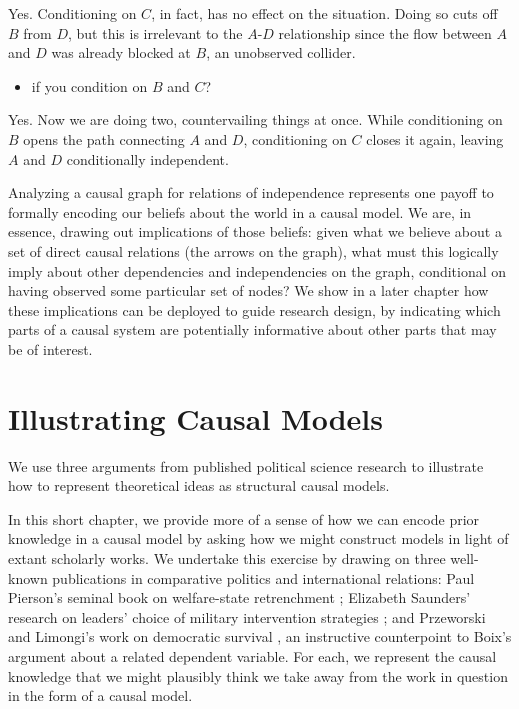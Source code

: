 \documentclass[
  12pt,
]{book}
\providecommand{\tightlist}{%
  \setlength{\itemsep}{0pt}\setlength{\parskip}{0pt}}
\newenvironment{headerbox}{
  \definecolor{shadecolor}{rgb}{0.8, 0.8, 0.8}  %
  \color{black}
  \begin{shaded}}{\end{shaded}}
\begin{document}
Yes. Conditioning on \(C\), in fact, has no effect on the situation. Doing so cuts off \(B\) from \(D\), but this is irrelevant to the \(A\)-\(D\) relationship since the flow between \(A\) and \(D\) was already blocked at \(B\), an unobserved collider.

\begin{itemize}
\tightlist
\item
  if you condition on \(B\) and \(C\)?
\end{itemize}

Yes. Now we are doing two, countervailing things at once. While conditioning on \(B\) opens the path connecting \(A\) and \(D\), conditioning on \(C\) closes it again, leaving \(A\) and \(D\) conditionally independent.

Analyzing a causal graph for relations of independence represents one payoff to formally encoding our beliefs about the world in a causal model. We are, in essence, drawing out implications of those beliefs: given what we believe about a set of direct causal relations (the arrows on the graph), what must this logically imply about other dependencies and independencies on the graph, conditional on having observed some particular set of nodes? We show in a later chapter how these implications can be deployed to guide research design, by indicating which parts of a causal system are potentially informative about other parts that may be of interest.

\hypertarget{illustratemodels}{%
\chapter{Illustrating Causal Models}\label{illustratemodels}}

\begin{headerbox}
We use three arguments from published political science research to illustrate how to represent theoretical ideas as structural causal models.

\end{headerbox}

In this short chapter, we provide more of a sense of how we can encode prior knowledge in a causal model by asking how we might construct models in light of extant scholarly works. We undertake this exercise by drawing on three well-known publications in comparative politics and international relations: Paul Pierson's seminal book on welfare-state retrenchment \citep{pierson1994dismantling}; Elizabeth Saunders' research on leaders' choice of military intervention strategies \citep{saunders2011leaders}; and Przeworski and Limongi's work on democratic survival \citep{przeworski1997modernization}, an instructive counterpoint to Boix's \citep{boix2003democracy} argument about a related dependent variable. For each, we represent the causal knowledge that we might plausibly think we take away from the work in question in the form of a causal model.
\end{document}
